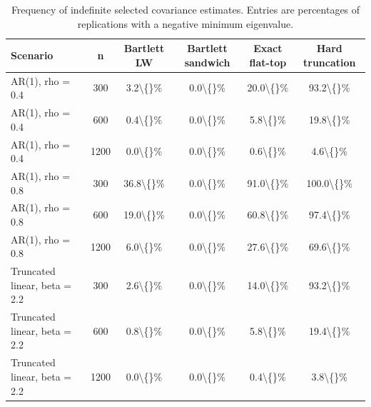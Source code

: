 \begin{table}[!htbp]
\small
\centering
\caption{Frequency of indefinite selected covariance estimates. Entries are percentages of replications with a negative minimum eigenvalue.}
\label{tab:negative-eigen-frequency}
\begin{tabular}{lccccc}
\toprule
Scenario & n & Bartlett LW & Bartlett sandwich & Exact flat-top & Hard truncation \\
\midrule
AR(1), rho = 0.4 & 300 & 3.2\textbackslash\{\}\% & 0.0\textbackslash\{\}\% & 20.0\textbackslash\{\}\% & 93.2\textbackslash\{\}\% \\
AR(1), rho = 0.4 & 600 & 0.4\textbackslash\{\}\% & 0.0\textbackslash\{\}\% & 5.8\textbackslash\{\}\% & 19.8\textbackslash\{\}\% \\
AR(1), rho = 0.4 & 1200 & 0.0\textbackslash\{\}\% & 0.0\textbackslash\{\}\% & 0.6\textbackslash\{\}\% & 4.6\textbackslash\{\}\% \\
AR(1), rho = 0.8 & 300 & 36.8\textbackslash\{\}\% & 0.0\textbackslash\{\}\% & 91.0\textbackslash\{\}\% & 100.0\textbackslash\{\}\% \\
AR(1), rho = 0.8 & 600 & 19.0\textbackslash\{\}\% & 0.0\textbackslash\{\}\% & 60.8\textbackslash\{\}\% & 97.4\textbackslash\{\}\% \\
AR(1), rho = 0.8 & 1200 & 6.0\textbackslash\{\}\% & 0.0\textbackslash\{\}\% & 27.6\textbackslash\{\}\% & 69.6\textbackslash\{\}\% \\
Truncated linear, beta = 2.2 & 300 & 2.6\textbackslash\{\}\% & 0.0\textbackslash\{\}\% & 14.0\textbackslash\{\}\% & 93.2\textbackslash\{\}\% \\
Truncated linear, beta = 2.2 & 600 & 0.8\textbackslash\{\}\% & 0.0\textbackslash\{\}\% & 5.8\textbackslash\{\}\% & 19.4\textbackslash\{\}\% \\
Truncated linear, beta = 2.2 & 1200 & 0.0\textbackslash\{\}\% & 0.0\textbackslash\{\}\% & 0.4\textbackslash\{\}\% & 3.8\textbackslash\{\}\% \\
\bottomrule
\end{tabular}
\end{table}

